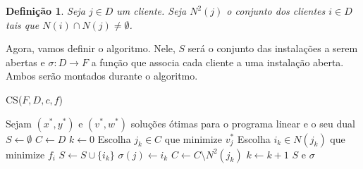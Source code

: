 \documentclass[12pt]{article}
\newtheorem{definition}[theorem]{Definição}
\begin{document}
\begin{definition}
    Seja $j\in D$ um cliente. Seja $N^2(j)$ o conjunto dos clientes $i \in D$ tais que $N(i) \cap N(j) \neq \emptyset$.
\end{definition}
Agora, vamos definir o algoritmo. Nele, $S$ será o conjunto das instalações a serem abertas e $\sigma : D \rightarrow F $ a função que associa cada cliente a uma instalação aberta. Ambos serão montados durante o algoritmo.
\begin{algorithm}
    \caption{CS($F,D,c,f$)}
    \label{fl:plrounding}
    \begin{algorithmic}[1]
        \State Sejam $(x^*,y^*)$ e $(v^*,w^*)$ soluções ótimas para o programa linear e o seu dual
        \State $S \gets \emptyset$
        \State $C \gets D$ 
        \State $k \gets 0$
        \State Escolha $j_k \in C$ que minimize $v_j^*$
        \State Escolha $i_k \in N(j_k)$ que minimize $f_{i}$
        \State $S \gets S \cup \{i_k\}$
        \State $\sigma(j) \leftarrow i_k$
        \EndFor
        \State $C \gets C \setminus N^2(j_k)$
        \State $k \gets k+1$
        \EndWhile
        \State \Return $S$ e $\sigma$
    \end{algorithmic}
\end{algorithm}
\end{document}
